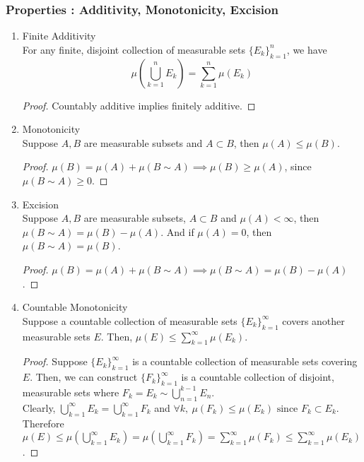 \subsubsection{Properties : Additivity, Monotonicity, Excision}
\begin{enumerate}
	\item Finite Additivity \\
		For any finite, disjoint collection of measurable sets $\{ E_k \}_{k = 1}^n$, we have
		$$ \mu\left(\bigcup_{k=1}^n E_k\right) = \sum_{k=1}^n \mu(E_k) $$
		\begin{proof}
			Countably additive implies finitely additive.
		\end{proof}
	\item Monotonicity \\
		Suppose $A,B$ are measurable subsets and $A \subset B$, then $\mu(A) \le \mu(B)$.
		\begin{proof}
			$\mu(B) = \mu(A) + \mu(B \sim A) \implies \mu(B) \ge \mu(A)$, since $\mu(B \sim A) \ge 0$.
		\end{proof}
	\item Excision \\
		Suppose $A,B$ are measurable subsets, $A \subset B$ and $\mu(A) < \infty$, then $\mu(B \sim A) = \mu(B) - \mu(A)$. And if $\mu(A) = 0$, then $\mu(B \sim A) = \mu(B)$.
		\begin{proof}
			$\mu(B) = \mu(A) + \mu(B \sim A) \implies \mu(B \sim A ) = \mu(B) - \mu(A)$.
		\end{proof}
	\item Countable Monotonicity \\
		Suppose a countable collection of measurable sets $\{ E_k \}_{k=1}^\infty$ covers another measurable sets $E$.
		Then, $\displaystyle \mu(E) \le \sum_{k=1}^\infty \mu(E_k)$.
		\begin{proof}
			Suppose $\{ E_k \}_{k=1}^\infty$ is a countable collection of measurable sets covering $E$.
			Then, we can construct $\{ F_k \}_{k=1}^\infty$ is a countable collection of disjoint, measurable sets where $\displaystyle F_k = E_k \sim \bigcup_{n=1}^{k-1} E_n$.\\

			Clearly, $\displaystyle \bigcup_{k=1}^\infty E_k = \bigcup_{k=1}^\infty F_k$ and $\forall k,\ \mu(F_k) \le \mu(E_k) \text{ since } F_k \subset E_k$.\\
			Therefore $\displaystyle \mu(E) \le \mu \left(\bigcup_{k=1}^\infty E_k \right) = \mu \left( \bigcup_{k=1}^\infty F_k \right) = \sum_{k=1}^\infty \mu(F_k) \le \sum_{k=1}^\infty \mu(E_k)$.
		\end{proof}
\end{enumerate}
